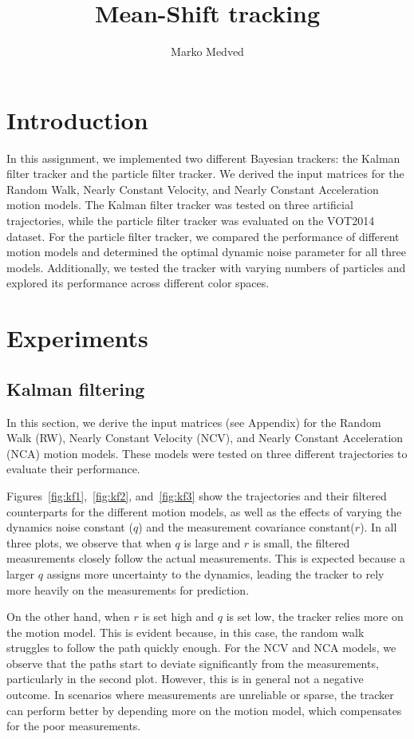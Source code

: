 \documentclass[9pt]{IEEEtran}
\title{\vspace{0ex}
Mean-Shift tracking}
\author{Marko Medved\vspace{-4.0ex}}
\begin{document}
\maketitle

\section{Introduction}
In this assignment, we implemented two different Bayesian trackers: the Kalman filter tracker 
and the particle filter tracker. We derived the input matrices for the Random Walk, 
Nearly Constant Velocity, and Nearly Constant Acceleration motion models. The Kalman
 filter tracker was tested on three artificial trajectories, while the particle filter 
 tracker was evaluated on the VOT2014 dataset. For the particle filter tracker, we compared the performance of different
  motion models and determined the optimal dynamic noise parameter for all three models.
   Additionally, we tested the tracker with varying numbers of particles and explored its
    performance across different color spaces.


\section{Experiments}
\subsection{Kalman filtering}
In this section, we derive the input matrices (see Appendix) for the Random Walk (RW), 
Nearly Constant Velocity (NCV), and Nearly Constant Acceleration (NCA) motion models. 
These models were tested on three different trajectories to evaluate their performance.


Figures~\ref{fig:kf1},~\ref{fig:kf2}, and~\ref{fig:kf3} show the trajectories and their 
filtered counterparts for the different motion models, as well as the effects of varying the 
dynamics noise constant (\(q\)) and the measurement covariance constant(\(r\)). In all three plots,
 we observe that when \(q\) is large and \(r\) is small, the filtered measurements closely 
 follow the actual measurements. This is expected because a larger \(q\) assigns more uncertainty 
 to the dynamics, leading the tracker to rely more heavily on the measurements for prediction.


 On the other hand, when \(r\) is set high and \(q\) is set low, the tracker 
 relies more on the motion model. This is evident because, in this case, the 
 random walk struggles to follow the path quickly enough. For the NCV and NCA models, 
 we observe that the paths start to deviate significantly from the measurements, particularly
  in the second plot. However, this is in general not a negative outcome. In scenarios where
   measurements are unreliable or sparse, the tracker can perform better by depending more on
    the motion model, which compensates for the poor measurements.
\end{document}
